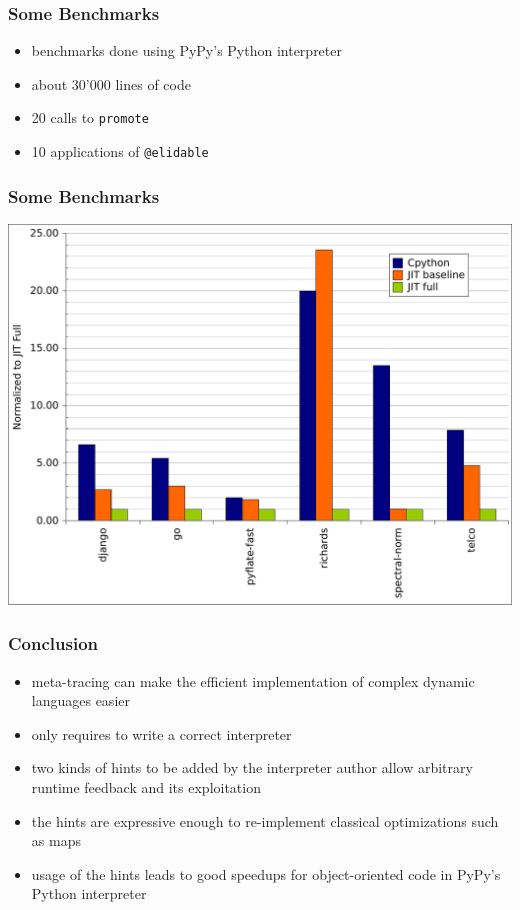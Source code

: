 \documentclass[utf8x]{beamer}
\begin{document}
\begin{frame}
  \frametitle{Some Benchmarks}
  \begin{itemize}
      \item benchmarks done using PyPy's Python interpreter
      \item about 30'000 lines of code
      \item 20 calls to \texttt{promote}
      \item 10 applications of \texttt{@elidable}
  \end{itemize}
\end{frame}

\begin{frame}
  \frametitle{Some Benchmarks}
  \includegraphics[scale=0.5]{figures/bench.pdf}
\end{frame}

\begin{frame}
  \frametitle{Conclusion}
  \begin{itemize}
      \item meta-tracing can make the efficient implementation of complex dynamic languages easier
      \item only requires to write a correct interpreter
      \item two kinds of hints to be added by the interpreter author allow arbitrary runtime feedback and its exploitation
      \item the hints are expressive enough to re-implement classical optimizations such as maps
      \item usage of the hints leads to good speedups for object-oriented code in PyPy's Python interpreter
  \end{itemize}
\end{frame}
\end{document}
